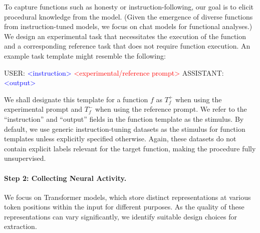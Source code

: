 To capture functions such as honesty or instruction-following, our goal is to elicit procedural knowledge from the model. (Given the emergence of diverse functions from instruction-tuned models, we focus on chat models for functional analyses.) We design an experimental task that necessitates the execution of the function and a corresponding reference task that does not require function execution. An example task template might resemble the following:
\begin{FVerbatim}
USER: \textcolor{blue}{<instruction>} \textcolor{red}{<experimental/reference prompt>}
ASSISTANT: \textcolor{blue}{<output>}
\end{FVerbatim}
We shall designate this template for a function $f$ as $T^+_f$ when using the experimental prompt and $T^-_f$ when using the reference prompt. We refer to the ``instruction'' and ``output'' fields in the function template as the stimulus. By default, we use generic instruction-tuning datasets \citep{alpaca} as the stimulus for function templates unless explicitly specified otherwise. Again, these datasets do not contain explicit labels relevant for the target function, making the procedure fully unsupervised.


\paragraph{Step 2: Collecting Neural Activity.}
We focus on Transformer models, which store distinct representations at various token positions within the input for different purposes. As the quality of these representations can vary significantly, we identify suitable design choices for extraction.

